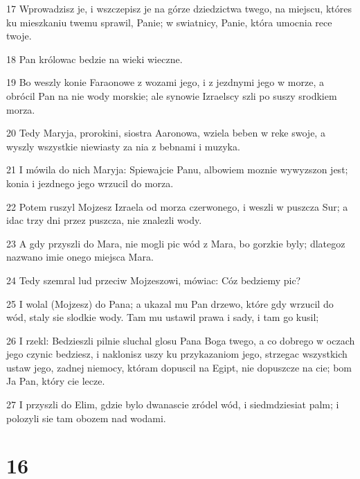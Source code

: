 \par 17 Wprowadzisz je, i wszczepisz je na górze dziedzictwa twego, na miejscu, któres ku mieszkaniu twemu sprawil, Panie; w swiatnicy, Panie, która umocnia rece twoje.
\par 18 Pan królowac bedzie na wieki wieczne.
\par 19 Bo weszly konie Faraonowe z wozami jego, i z jezdnymi jego w morze, a obrócil Pan na nie wody morskie; ale synowie Izraelscy szli po suszy srodkiem morza.
\par 20 Tedy Maryja, prorokini, siostra Aaronowa, wziela beben w reke swoje, a wyszly wszystkie niewiasty za nia z bebnami i muzyka.
\par 21 I mówila do nich Maryja: Spiewajcie Panu, albowiem moznie wywyzszon jest; konia i jezdnego jego wrzucil do morza.
\par 22 Potem ruszyl Mojzesz Izraela od morza czerwonego, i weszli w puszcza Sur; a idac trzy dni przez puszcza, nie znalezli wody.
\par 23 A gdy przyszli do Mara, nie mogli pic wód z Mara, bo gorzkie byly; dlategoz nazwano imie onego miejsca Mara.
\par 24 Tedy szemral lud przeciw Mojzeszowi, mówiac: Cóz bedziemy pic?
\par 25 I wolal (Mojzesz) do Pana; a ukazal mu Pan drzewo, które gdy wrzucil do wód, staly sie slodkie wody. Tam mu ustawil prawa i sady, i tam go kusil;
\par 26 I rzekl: Bedzieszli pilnie sluchal glosu Pana Boga twego, a co dobrego w oczach jego czynic bedziesz, i naklonisz uszy ku przykazaniom jego, strzegac wszystkich ustaw jego, zadnej niemocy, któram dopuscil na Egipt, nie dopuszcze na cie; bom Ja Pan, który cie lecze.
\par 27 I przyszli do Elim, gdzie bylo dwanascie zródel wód, i siedmdziesiat palm; i polozyli sie tam obozem nad wodami.

\chapter{16}

